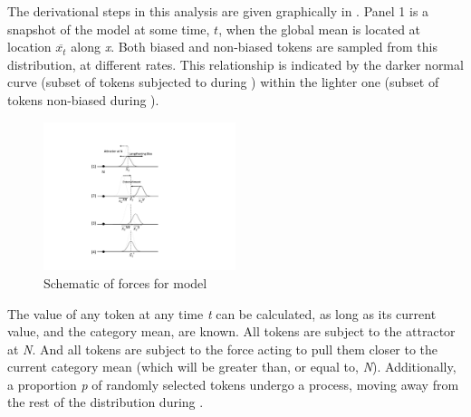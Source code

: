 The derivational steps in this analysis are given graphically in .
Panel 1 is a snapshot of the model at some
time, \emph{$t$}, when the global mean is located at location $\overline{x_{t}}$
along \emph{x}. Both biased and non-biased tokens are sampled from
this distribution, at different rates. This relationship is indicated
by the darker normal curve (subset of tokens subjected to  during
) within the lighter one (subset of tokens non-biased during
). 

\begin{figure}[h]
\includegraphics[width=0.50\textwidth]{figures/Model1Behavior.pdf}\caption{\label{fig:Derivation}Schematic of forces for  model}
\end{figure}

The  value of any token at any time \emph{t} can be calculated,
as long as its current value, and the category mean, are known. All
tokens are subject to the attractor at \emph{N}. And all tokens are
subject to the  force acting to pull them closer to the
current category mean (which will be greater than, or equal to, \emph{N}).
Additionally, a proportion \emph{p} of randomly selected tokens undergo
a  process, moving away from the rest of the distribution
during .\largerpage[-2]

